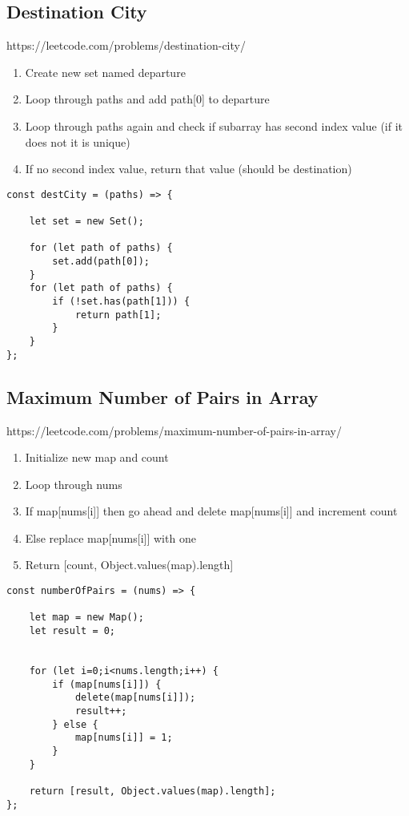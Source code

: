 \documentclass[10pt]{article}
\begin{document}
\medskip 
\subsection{Destination City}
https://leetcode.com/problems/destination-city/

\begin{enumerate}
	\item Create new set named departure
	\item Loop through paths and add path[0] to departure
	\item Loop through paths again and check if subarray has second index value (if it does not it is unique)
	\item If no second index value, return that value (should be destination)
\end{enumerate}

\begin{lstlisting}[title=Solution destCity, captionpos=t]
const destCity = (paths) => {
    
    let set = new Set();
    
    for (let path of paths) {
        set.add(path[0]);
    }
    for (let path of paths) {
        if (!set.has(path[1])) {
            return path[1];
        }
    }
};
\end{lstlisting}
\medskip %





\pagebreak %
\medskip   
\subsection{Maximum Number of Pairs in Array}
https://leetcode.com/problems/maximum-number-of-pairs-in-array/

\begin{enumerate}
	\item Initialize new map and count
	\item Loop through nums
	\item If map[nums[i]] then go ahead and delete map[nums[i]] and increment count
	\item Else replace map[nums[i]] with one
	\item Return [count, Object.values(map).length]
\end{enumerate}

\begin{lstlisting}[title=Solution numberOfPairs, captionpos=t]
const numberOfPairs = (nums) => {
    
    let map = new Map();
    let result = 0;
    
    
    for (let i=0;i<nums.length;i++) {
        if (map[nums[i]]) {
            delete(map[nums[i]]);
            result++;
        } else {
            map[nums[i]] = 1;
        }
    }

    return [result, Object.values(map).length];
};
\end{lstlisting}
\medskip %
\end{document}
